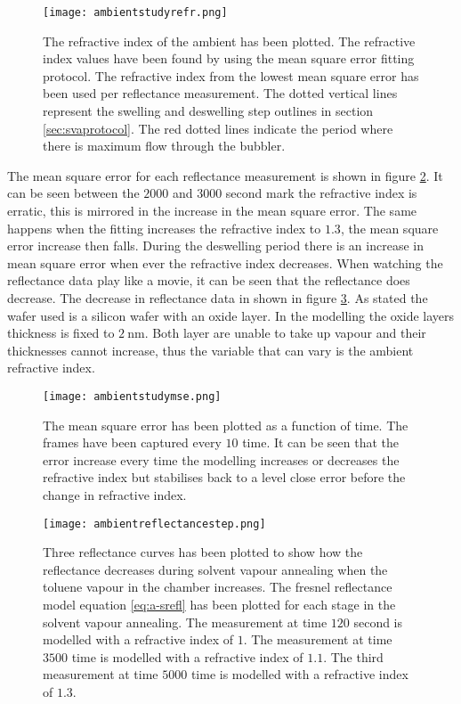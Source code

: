 \documentclass[MasterThesisMain.tex]{subfiles}
\begin{document}
\begin{figure}
\centering
\texttt{[image: ambientstudyrefr.png]}
\caption{The refractive index of the ambient has been plotted. The refractive index values have been found by using the mean square error fitting protocol. The refractive index from the lowest mean square error has been used per reflectance measurement. The dotted vertical lines represent the swelling and deswelling step outlines in section \ref{sec:svaprotocol}. The red dotted lines indicate the period where there is maximum flow through the bubbler.}
\label{fig:ambientrefr}
\end{figure}

The mean square error for each reflectance measurement is shown in figure \ref{fig:ambientmse}. It can be seen between the $2000$ and $3000$ second mark the refractive index is erratic, this is mirrored in the increase in the mean square error. The same happens when the fitting increases the refractive index to $1.3$, the mean square error increase then falls. During the deswelling period there is an increase in mean square error when ever the refractive index decreases. When watching the reflectance data play like a movie, it can be seen that the reflectance does decrease. The decrease in reflectance data in shown in figure \ref{fig:ambientreflectance}. As stated the wafer used is a silicon wafer with an oxide layer. In the modelling the oxide layers thickness is fixed to $\SI{2}{\nano\meter}$. Both layer are unable to take up vapour and their thicknesses cannot increase, thus the variable that can vary is the ambient refractive index.

\begin{figure}
\centering
\texttt{[image: ambientstudymse.png]}
\caption{The mean square error has been plotted as a function of time. The frames have been captured every $10$ time. It can be seen that the error increase every time the modelling increases or decreases the refractive index but stabilises back to a level close error before the change in refractive index.}
\label{fig:ambientmse}
\end{figure}

\begin{figure}
\centering
\texttt{[image: ambientreflectancestep.png]}
\caption{Three reflectance curves has been plotted to show how the reflectance decreases during solvent vapour annealing when the toluene vapour in the chamber increases. The fresnel reflectance model equation \ref{eq:a-srefl} has been plotted for each stage in the solvent vapour annealing. The measurement at time $120$ second is modelled with a refractive index of $1$. The measurement at time $3500$ time is modelled with a refractive index of $1.1$. The third measurement at time $5000$ time is modelled with a refractive index of $1.3$.}
\label{fig:ambientreflectance}
\end{figure}
\end{document}
